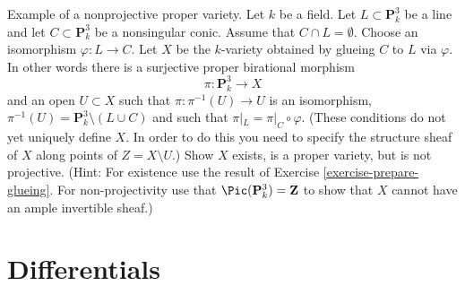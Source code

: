 \begin{exercise}
\label{exercise-nonprojective}
Example of a nonprojective proper variety.
Let $k$ be a field. Let $L \subset \mathbf{P}^3_k$ be a line and
let $C \subset \mathbf{P}^3_k$ be a nonsingular conic. Assume that
$C \cap L = \emptyset$. Choose an
isomorphism $\varphi : L \to C$. Let $X$ be the $k$-variety obtained
by glueing $C$ to $L$ via $\varphi$. In other words there is
a surjective proper birational morphism
$$
\pi : \mathbf{P}^3_k \longrightarrow X
$$
and an open $U \subset X$ such that $\pi : \pi^{-1}(U) \to U$ is
an isomorphism, $\pi^{-1}(U) = \mathbf{P}^3_k \setminus (L \cup C)$
and such that $\pi|_L = \pi|_C \circ \varphi$. (These conditions do not
yet uniquely define $X$. In order to do this you need to specify the
structure sheaf of $X$ along points of $Z = X \setminus U$.)
Show $X$ exists, is a proper variety, but is not projective.
(Hint: For existence use the result of
Exercise \ref{exercise-prepare-glueing}. For non-projectivity use that
$\Pic(\mathbf{P}^3_k) = \mathbf{Z}$ to show that $X$ cannot have
an ample invertible sheaf.)
\end{exercise}



\section{Differentials}
\label{section-differentials}

